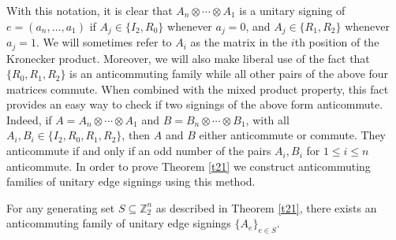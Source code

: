 With this notation, it is clear that 
$A_n \otimes \cdots \otimes A_1$ is a unitary signing 
of $e = (a_n, \ldots, a_1)$ if $A_j \in \{I_2, R_0 \}$ whenever $a_j = 0$, 
and $A_j \in \{R_1, R_2 \}$ whenever $a_j = 1$. 
We will sometimes refer to $A_i$ as the matrix in the $i$th position 
of the Kronecker product. Moreover, we will also make liberal use of 
the fact that $\{ R_0, R_1, R_2 \}$ is an anticommuting family while 
all other pairs of the above four matrices commute. 
When combined with the mixed product property, this fact provides 
an easy way to check if two signings of the above form anticommute. 
Indeed, if $A = A_n \otimes \cdots \otimes A_1$ and 
$B = B_n \otimes \cdots \otimes B_1$, with all 
$A_i, B_i \in \{I_2, R_0, R_1, R_2 \}$, then $A$ and $B$ 
either anticommute or commute. They anticommute if and only if 
an odd number of the pairs $A_i, B_i$  for $1 \leq i \leq n$
anticommute. 
In order to prove Theorem \ref{t21} we
construct anticommuting families of unitary edge signings using this method.
\begin{lemma}
\label{lm: AC}
For any generating set $S \subseteq \mathbb{Z}_{2}^{n}$ 
as described in Theorem \ref{t21}, there exists an anticommuting 
family of unitary edge signings $\{A_e\}_{e \in S}$.
\end{lemma}
